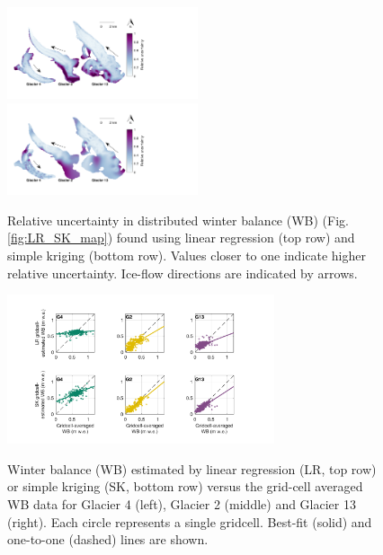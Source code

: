 \documentclass[twocolumn, letterpaper]{igs}
\begin{document}
\begin{figure}
	\centering
	\includegraphics[width =0.5\textwidth]{SpatialVar_LR.pdf}\\
	\includegraphics[width =0.5\textwidth]{SpatialVar_SK.pdf}\\
	\caption{Relative uncertainty in distributed winter balance (WB) (Fig. \ref{fig:LR_SK_map}) found using linear regression (top row) and simple kriging (bottom row). Values closer to one indicate higher relative uncertainty. Ice-flow directions are indicated by arrows.}
	\label{fig:WSMBspatialvar}
\end{figure}

\begin{figure}
	\centering
	\includegraphics[width =0.7\textwidth]{observedVSestimated_S2.pdf}\\
	\caption{Winter balance (WB) estimated by linear regression (LR, top row) or simple kriging (SK, bottom row) versus the grid-cell averaged WB data for Glacier 4 (left), Glacier 2 (middle) and Glacier 13 (right). Each circle represents a single gridcell. Best-fit (solid) and one-to-one (dashed) lines are shown.}
	\label{fig:observedVSestimated_S2}
\end{figure}
\end{document}
